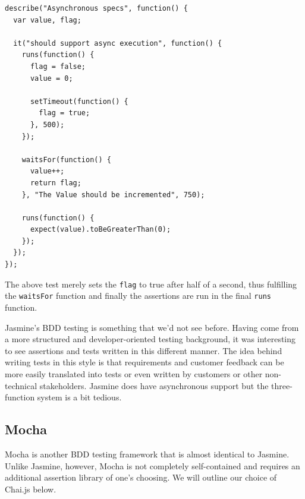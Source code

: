 \documentclass[12pt]{ucthesis}
\begin{document}
\begin{lstlisting}
describe("Asynchronous specs", function() {
  var value, flag;

  it("should support async execution", function() {
    runs(function() {
      flag = false;
      value = 0;

      setTimeout(function() {
        flag = true;
      }, 500);
    });

    waitsFor(function() {
      value++;
      return flag;
    }, "The Value should be incremented", 750);

    runs(function() {
      expect(value).toBeGreaterThan(0);
    });
  });
});
\end{lstlisting}

The above test merely sets the \lstinline{flag} to true after half of a second, thus fulfilling the \lstinline{waitsFor} function and finally the assertions are run in the final \lstinline{runs} function.

Jasmine's BDD testing is something that we'd not see before. Having come from a more structured and developer-oriented testing background, it was interesting to see assertions and tests written in this different manner. The idea behind writing tests in this style is that requirements and customer feedback can be more easily translated into tests or even written by customers or other non-technical stakeholders. Jasmine does have asynchronous support but the three-function system is a bit tedious.

\subsection{Mocha}
Mocha\cite{Mocha} is another BDD testing framework that is almost identical to Jasmine. Unlike Jasmine, however, Mocha is not completely self-contained and requires an additional assertion library of one's choosing. We will outline our choice of Chai.js below.
\end{document}
